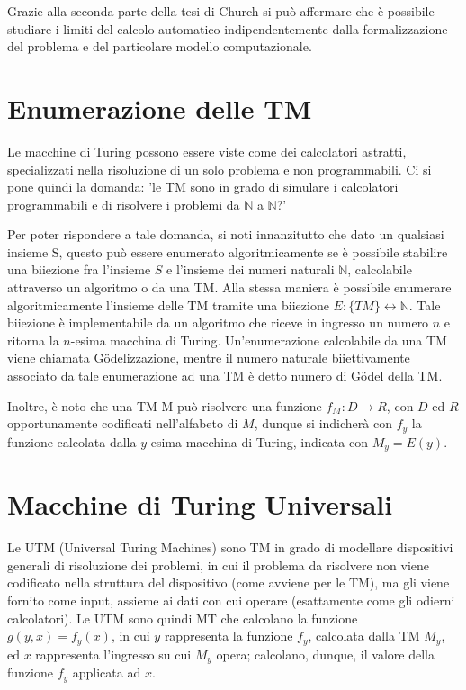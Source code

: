   Grazie alla seconda parte della tesi di Church si può affermare che è possibile studiare i limiti del calcolo automatico indipendentemente dalla formalizzazione del problema e del particolare modello computazionale.

  \section{Enumerazione delle TM}
  Le macchine di Turing possono essere viste come dei calcolatori astratti, specializzati nella risoluzione di un solo problema e non programmabili. Ci si pone quindi la domanda: 'le TM sono in grado di simulare i calcolatori programmabili e di risolvere i problemi da \(\mathbb{N}\) a \(\mathbb{N}\)?'

  Per poter rispondere a tale domanda, si noti innanzitutto che dato un qualsiasi insieme S, questo può essere enumerato algoritmicamente se è possibile stabilire una biiezione fra l'insieme \(S\) e l'insieme dei numeri naturali \(\mathbb{N}\), calcolabile attraverso un algoritmo o da una TM.
  Alla stessa maniera è possibile enumerare algoritmicamente l'insieme delle TM tramite una biiezione \(E:\{TM\}\leftrightarrow\mathbb{N}\). Tale biiezione è implementabile da un algoritmo che riceve in ingresso un numero \(n\) e ritorna la \(n\)-esima macchina di Turing. Un'enumerazione calcolabile da una TM viene chiamata Gödelizzazione, mentre il numero naturale biiettivamente associato da tale enumerazione ad una TM è detto numero di Gödel della TM. 

  Inoltre, è noto che una TM M può risolvere una funzione \(f_M:D\to R\), con \(D\) ed \(R\) opportunamente codificati nell'alfabeto di \(M\), dunque si indicherà con \(f_y\) la funzione calcolata dalla \(y\)-esima macchina di Turing, indicata con \(M_y=E(y)\).

  \section{Macchine di Turing Universali}
  Le UTM (Universal Turing Machines) sono TM in grado di modellare dispositivi generali di risoluzione dei problemi, in cui il problema da risolvere non viene codificato nella struttura del dispositivo (come avviene per le TM), ma gli viene fornito come input, assieme ai dati con cui operare (esattamente come gli odierni calcolatori). Le UTM sono quindi MT che calcolano la funzione \(g(y,x)=f_y(x)\), in cui \(y\) rappresenta la funzione \(f_y\), calcolata dalla TM \(M_y\), ed \(x\) rappresenta l'ingresso su cui \(M_y\) opera; calcolano, dunque, il valore della funzione \(f_y\) applicata ad \(x\).

